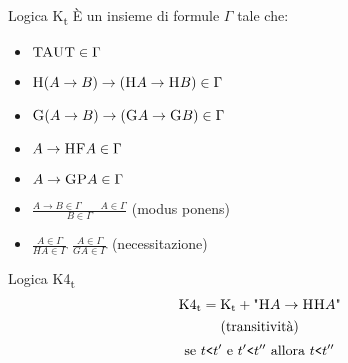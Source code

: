 \documentclass{beamer}
\begin{document}
\begin{frame}{Logica K\textsubscript{t}}
    È un insieme di formule $\Gamma$ tale che:
    \begin{itemize}
        \item $\textsc{TAUT} \in \Gamma$
        \item $\textsc{H}(A \to B) \to (\textsc{H}A \to \textsc{H}B) \in \Gamma$
        \item $\textsc{G}(A \to B) \to (\textsc{G}A \to \textsc{G}B) \in \Gamma$
        \item $A \to \textsc{H}\textsc{F}A \in \Gamma$
        \item $A \to \textsc{G}\textsc{P}A \in \Gamma$
        \item $\frac{A \to B \in \Gamma \hspace{2em} A \in \Gamma}{B \in \Gamma}$ \tab\hspace{-4em}(modus ponens)
        \item $\frac{A \in \Gamma}{HA \in \Gamma}$ \hspace{0.5em} $\frac{A \in \Gamma}{GA \in \Gamma}$ \tab\hspace{-4em}(necessitazione)
    \end{itemize}
\end{frame}

\begin{frame}{Logica K4\textsubscript{t}}
    $$\textup{K4\textsubscript{t}} = \textup{K\textsubscript{t}} + \textup{"}\textsc{H}A \to \textsc{HH}A\textup{"}$$
    $$\textup{(transitività)}$$
    \endgraf
    \bigskip
    \endgraf
    \bigskip
    $$\textup{se } t \texttt{<} {t'} \textup{ e } {t'} \texttt{<} {t''} \textup{ allora } t \texttt{<} {t''}$$
\end{frame}
\end{document}
